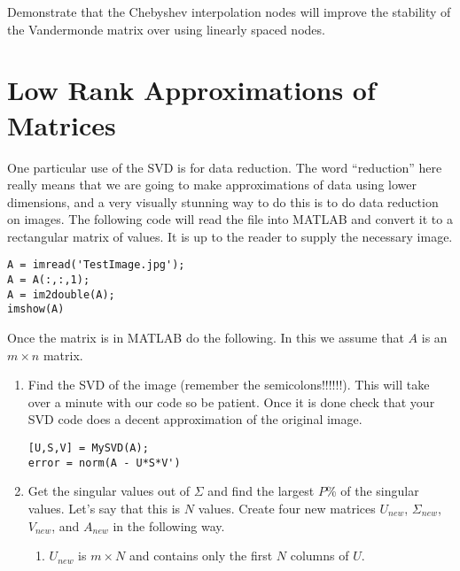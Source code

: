 \begin{problem}
    Demonstrate that the Chebyshev interpolation nodes will improve the stability of the
    Vandermonde matrix over using linearly spaced nodes.
\end{problem}


\newpage\section{Low Rank Approximations of Matrices}

\begin{problem}
    One particular use of the SVD is for data reduction.  The word ``reduction'' here
    really means that we are going to make approximations of data using lower dimensions,
    and a very visually stunning way to do this is to do data reduction on images.  The following code will read
    the file  into MATLAB and convert it to a rectangular matrix of
    values.  It is up to the reader to supply the necessary image.
\begin{lstlisting}
A = imread('TestImage.jpg');
A = A(:,:,1);
A = im2double(A);
imshow(A)
\end{lstlisting}
    Once the matrix is in MATLAB do the following.  In this we assume that $A$ is an $m
    \times n$ matrix.
    \begin{enumerate}
        \item Find the SVD of the image (remember the semicolons!!!!!!).  This will take
            over a minute with our code so be patient.  Once it is done check that your
            SVD code does a decent approximation of the original image.
\begin{lstlisting}
[U,S,V] = MySVD(A);
error = norm(A - U*S*V')
\end{lstlisting}
        \item Get the singular values out of $\Sigma$ and find the largest $P$\% of the
            singular values. Let's say that this is $N$ values.  Create four new matrices
            $U_{new}$, $\Sigma_{new}$, $V_{new}$, and $A_{new}$ in the following way.
            \begin{enumerate}
                \item $U_{new}$ is $m \times N$ and contains only the first $N$ columns of
                    $U$.

\end{enumerate}
\end{enumerate}
\end{problem}
